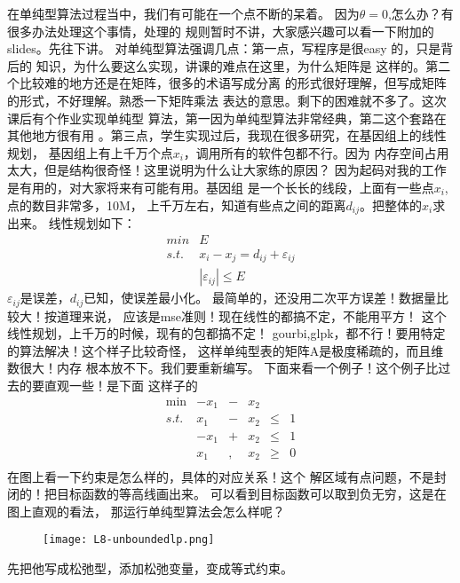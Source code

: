 {{}
{
	在单纯型算法过程当中，我们有可能在一个点不断的呆着。
	因为$\theta = 0$,怎么办？有很多办法处理这个事情，处理的
	规则暂时不讲，大家感兴趣可以看一下附加的slides。先往下讲。
}
{
	对单纯型算法强调几点：第一点，写程序是很easy 的，只是背后的
	知识，为什么要这么实现，讲课的难点在这里，为什么矩阵是
	这样的。第二个比较难的地方还是在矩阵，很多的术语写成分离
	的形式很好理解，但写成矩阵的形式，不好理解。熟悉一下矩阵乘法
	表达的意思。剩下的困难就不多了。这次课后有个作业实现单纯型
	算法，第一因为单纯型算法非常经典，第二这个套路在其他地方很有用
	。第三点，学生实现过后，我现在很多研究，在基因组上的线性规划，
	基因组上有上千万个点$x_{i}$，调用所有的软件包都不行。因为
	内存空间占用太大，但是结构很奇怪！这里说明为什么让大家练的原因？
	因为起码对我的工作是有用的，对大家将来有可能有用。基因组
	是一个长长的线段，上面有一些点$x_{i}$,点的数目非常多，10M，
	上千万左右，知道有些点之间的距离$d_{ij}$。把整体的$x_i$求出来。
	线性规划如下：
	\[
	\begin{array}{ll}
	min & E \\
	s.t. & x_{i} - x_{j} = d_{ij} + \varepsilon_{ij} \\
	& |\varepsilon_{ij}| \leq E
	\end{array}
	\]
	$\varepsilon_{ij}$是误差，$d_{ij}$已知，使误差最小化。
	最简单的，还没用二次平方误差！数据量比较大！按道理来说，
	应该是mse准则！现在线性的都搞不定，不能用平方！
	这个线性规划，上千万的时候，现有的包都搞不定！
	gourbi,glpk，都不行！要用特定的算法解决！这个样子比较奇怪，
	这样单纯型表的矩阵A是极度稀疏的，而且维数很大！内存
	根本放不下。我们要重新编写。
}
{
	下面来看一个例子！这个例子比过去的要直观一些！是下面
	这样子的\[
	\begin{array}{rrrrrrl}
	\min & - x_1 & - & x_2 & \\
	s.t. &   x_1 & - & x_2 & \leq & 1   \\
	& - x_1 & + & x_2 & \leq & 1   \\
	&   x_1 &,  & x_2 & \geq & 0   \\
	\end{array} \nonumber
	\]
	在图上看一下约束是怎么样的，具体的对应关系！这个
	解区域有点问题，不是封闭的！把目标函数的等高线画出来。
	可以看到目标函数可以取到负无穷，这是在图上直观的看法，
	那运行单纯型算法会怎么样呢？
}
{
	\begin{figure}
		\texttt{[image: L8-unboundedlp.png]}
	\end{figure}
}
{
	先把他写成松弛型，添加松弛变量，变成等式约束。

}
{



}}
